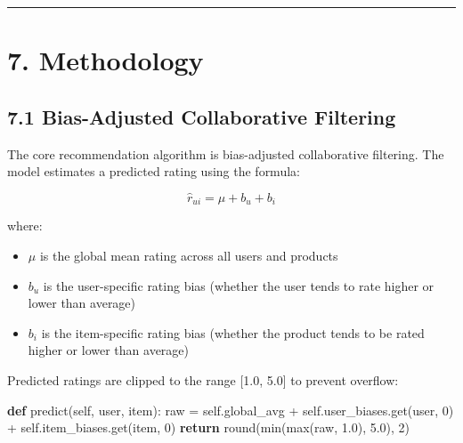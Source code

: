 \documentclass[
  letterpaper,
  DIV=11,
  numbers=noendperiod]{scrartcl}
\newenvironment{Shaded}{\begin{snugshade}}{\end{snugshade}}
\newcommand{\BuiltInTok}[1]{\textcolor[rgb]{0.00,0.23,0.31}{#1}}
\newcommand{\ControlFlowTok}[1]{\textcolor[rgb]{0.00,0.23,0.31}{\textbf{#1}}}
\newcommand{\DecValTok}[1]{\textcolor[rgb]{0.68,0.00,0.00}{#1}}
\newcommand{\FloatTok}[1]{\textcolor[rgb]{0.68,0.00,0.00}{#1}}
\newcommand{\KeywordTok}[1]{\textcolor[rgb]{0.00,0.23,0.31}{\textbf{#1}}}
\newcommand{\NormalTok}[1]{\textcolor[rgb]{0.00,0.23,0.31}{#1}}
\newcommand{\OperatorTok}[1]{\textcolor[rgb]{0.37,0.37,0.37}{#1}}
\newcommand{\VariableTok}[1]{\textcolor[rgb]{0.07,0.07,0.07}{#1}}
\providecommand{\tightlist}{%
  \setlength{\itemsep}{0pt}\setlength{\parskip}{0pt}}
\begin{document}
\begin{center}\rule{0.5\linewidth}{0.5pt}\end{center}

\section{7. Methodology}\label{methodology}

\subsection{7.1 Bias-Adjusted Collaborative
Filtering}\label{bias-adjusted-collaborative-filtering}

The core recommendation algorithm is bias-adjusted collaborative
filtering. The model estimates a predicted rating using the formula:

\[\hat{r}_{ui} = \mu + b_u + b_i\]

where:

\begin{itemize}
\tightlist
\item
  \(\mu\) is the global mean rating across all users and products
\item
  \(b_u\) is the user-specific rating bias (whether the user tends to
  rate higher or lower than average)
\item
  \(b_i\) is the item-specific rating bias (whether the product tends to
  be rated higher or lower than average)
\end{itemize}

Predicted ratings are clipped to the range {[}1.0, 5.0{]} to prevent
overflow:

\protect{}\label{code-predict}
\begin{Shaded}
\begin{Highlighting}[]
\KeywordTok{def}\NormalTok{ predict(}\VariableTok{self}\NormalTok{, user, item):}
\NormalTok{    raw }\OperatorTok{=} \VariableTok{self}\NormalTok{.global\_avg }\OperatorTok{+} \VariableTok{self}\NormalTok{.user\_biases.get(user, }\DecValTok{0}\NormalTok{) }\OperatorTok{+} \VariableTok{self}\NormalTok{.item\_biases.get(item, }\DecValTok{0}\NormalTok{)}
    \ControlFlowTok{return} \BuiltInTok{round}\NormalTok{(}\BuiltInTok{min}\NormalTok{(}\BuiltInTok{max}\NormalTok{(raw, }\FloatTok{1.0}\NormalTok{), }\FloatTok{5.0}\NormalTok{), }\DecValTok{2}\NormalTok{)}
\end{Highlighting}
\end{Shaded}
\end{document}
